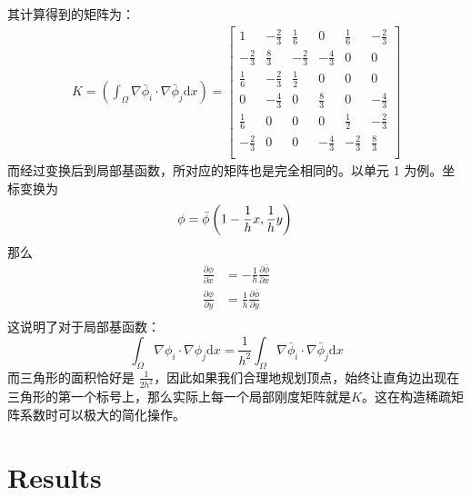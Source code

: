 \documentclass{ctexart}
\begin{document}
其计算得到的矩阵为：
\begin{eqnarray}
  K = \left(\int_\Omega \nabla \bar\phi_i\cdot \nabla \bar\phi_j \mathrm dx\right) = 
  \begin{bmatrix}
    1 & -\frac{2}{3} & \frac{1}{6} & 0 & \frac{1}{6} & -\frac{2}{3} \\
    -\frac{2}{3} & \frac{8}{3} & -\frac{2}{3} & -\frac{4}{3} & 0 & 0 \\
    \frac{1}{6} & -\frac{2}{3} & \frac{1}{2} & 0 & 0 & 0 \\
    0 & -\frac{4}{3} & 0 & \frac{8}{3} & 0 & -\frac{4}{3} \\
    \frac{1}{6} & 0 & 0 & 0 & \frac{1}{2} & -\frac{2}{3} \\
    -\frac{2}{3} & 0 & 0 & -\frac{4}{3} & -\frac{2}{3} & \frac{8}{3} \\
  \end{bmatrix}
\end{eqnarray}
而经过变换后到局部基函数，所对应的矩阵也是完全相同的。以单元 1 为例。坐标变换为
\begin{equation}
  \phi = \bar\phi\left(1 - \frac{1}{h} x, \frac{1}{h} y\right)\\
\end{equation}
那么
\begin{equation}
  \begin{aligned}
    \frac{\partial \phi}{\partial x} &= - \frac{1}{h}\frac{\partial \bar \phi}{\partial x}\\
    \frac{\partial \phi}{\partial y} &= \frac{1}{h}\frac{\partial \bar \phi}{\partial y}\\
  \end{aligned}
\end{equation}
这说明了对于局部基函数：
\begin{equation}
  \int_\Omega \nabla \phi_i \cdot \nabla \phi_j \mathrm dx = \frac{1}{h^2} \int_\Omega \nabla \bar \phi_i\cdot \nabla \bar \phi_j \mathrm dx
\end{equation}
而三角形的面积恰好是 $\frac{1}{2h^2}$，因此如果我们合理地规划顶点，始终让直角边出现在三角形的第一个标号上，那么实际上每一个局部刚度矩阵就是$K$。这在构造稀疏矩阵系数时可以极大的简化操作。

\section{Results}
\end{document}
